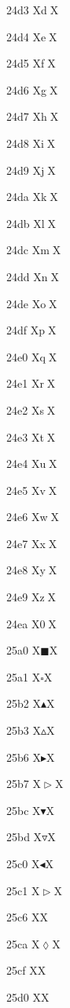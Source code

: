 \documentclass[11pt]{article}
\begin{document}
24d3 X{\textcircled{d}}X

24d4 X{\textcircled{e}}X

24d5 X{\textcircled{f}}X

24d6 X{\textcircled{g}}X

24d7 X{\textcircled{h}}X

24d8 X{\textcircled{i}}X

24d9 X{\textcircled{j}}X

24da X{\textcircled{k}}X

24db X{\textcircled{l}}X

24dc X{\textcircled{m}}X

24dd X{\textcircled{n}}X

24de X{\textcircled{o}}X

24df X{\textcircled{p}}X

24e0 X{\textcircled{q}}X

24e1 X{\textcircled{r}}X

24e2 X{\textcircled{s}}X

24e3 X{\textcircled{t}}X

24e4 X{\textcircled{u}}X

24e5 X{\textcircled{v}}X

24e6 X{\textcircled{w}}X

24e7 X{\textcircled{x}}X

24e8 X{\textcircled{y}}X

24e9 X{\textcircled{z}}X

24ea X{\textcircled{0}}X

25a0 X{\ensuremath{\blacksquare}}X

25a1 X{\ensuremath{\square}}X

25b2 X{\ensuremath{\blacktriangle}}X

25b3 X{\ensuremath{\vartriangle}}X

25b6 X{\ensuremath{\blacktriangleright}}X

25b7 X{\ensuremath{\vartriangleright}}X

25bc X{\ensuremath{\blacktriangledown}}X

25bd X{\ensuremath{\triangledown}}X

25c0 X{\ensuremath{\blacktriangleleft}}X

25c1 X{\ensuremath{\vartriangleright}}X

25c6 X{}X

25ca X{\ensuremath{\lozenge}}X

25cf X{\CIRCLE}X

25d0 X{\LEFTcircle}X
\end{document}
